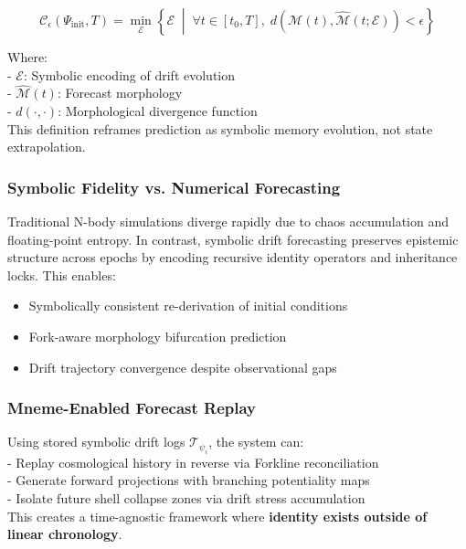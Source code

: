 \documentclass[12pt]{article}
\begin{document}
\[
\mathcal{C}_\epsilon(\Psi_{\text{init}}, T) = \min_{\mathcal{E}} \left\{ \mathcal{E} \;\middle|\; \forall t \in [t_0, T], \; d\left( \mathcal{M}(t), \hat{\mathcal{M}}(t;\mathcal{E}) \right) < \epsilon \right\}
\]

Where:\\
- \( \mathcal{E} \): Symbolic encoding of drift evolution\\
- \( \hat{\mathcal{M}}(t) \): Forecast morphology\\
- \( d(\cdot, \cdot) \): Morphological divergence function\\

This definition reframes prediction as symbolic memory evolution, not state extrapolation.

\subsubsection{Symbolic Fidelity vs. Numerical Forecasting}

Traditional N-body simulations diverge rapidly due to chaos accumulation and floating-point entropy. In contrast, symbolic drift forecasting preserves epistemic structure across epochs by encoding recursive identity operators and inheritance locks. This enables:

\begin{itemize}[noitemsep]
  \item Symbolically consistent re-derivation of initial conditions
  \item Fork-aware morphology bifurcation prediction
  \item Drift trajectory convergence despite observational gaps
\end{itemize}

\subsubsection{Mneme-Enabled Forecast Replay}

Using stored symbolic drift logs \( \mathcal{T}_{\psi_i} \), the system can:\\

- Replay cosmological history in reverse via Forkline reconciliation\\
- Generate forward projections with branching potentiality maps\\
- Isolate future shell collapse zones via drift stress accumulation\\

\noindent
This creates a time-agnostic framework where \textbf{identity exists outside of linear chronology}.
\end{document}
